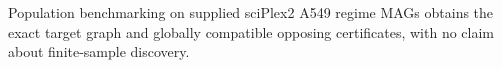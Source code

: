 Population benchmarking on supplied sciPlex2 A549 regime MAGs obtains the exact target graph and globally compatible opposing certificates, with no claim about finite-sample discovery.